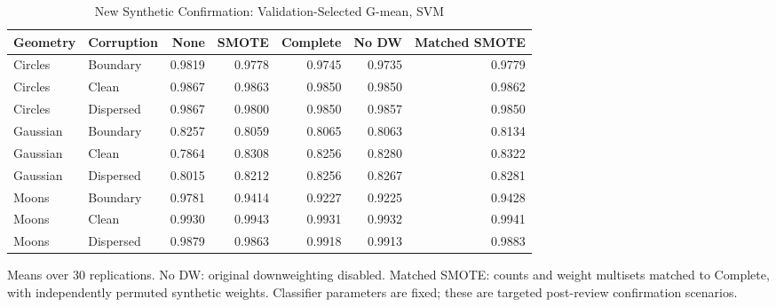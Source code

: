\begin{table}[t]
\caption{New Synthetic Confirmation: Validation-Selected G-mean, SVM}
\centering\small
\begin{tabular}{llrrrrr}
\hline
Geometry & Corruption & None & SMOTE & Complete & No DW & Matched SMOTE\\
\hline
Circles & Boundary & 0.9819 & 0.9778 & 0.9745 & 0.9735 & 0.9779 \\
Circles & Clean & 0.9867 & 0.9863 & 0.9850 & 0.9850 & 0.9862 \\
Circles & Dispersed & 0.9867 & 0.9800 & 0.9850 & 0.9857 & 0.9850 \\
Gaussian & Boundary & 0.8257 & 0.8059 & 0.8065 & 0.8063 & 0.8134 \\
Gaussian & Clean & 0.7864 & 0.8308 & 0.8256 & 0.8280 & 0.8322 \\
Gaussian & Dispersed & 0.8015 & 0.8212 & 0.8256 & 0.8267 & 0.8281 \\
Moons & Boundary & 0.9781 & 0.9414 & 0.9227 & 0.9225 & 0.9428 \\
Moons & Clean & 0.9930 & 0.9943 & 0.9931 & 0.9932 & 0.9941 \\
Moons & Dispersed & 0.9879 & 0.9863 & 0.9918 & 0.9913 & 0.9883 \\
\hline
\end{tabular}
\par\smallskip\footnotesize Means over 30 replications. No DW: original downweighting disabled. Matched SMOTE: counts and weight multisets matched to Complete, with independently permuted synthetic weights. Classifier parameters are fixed; these are targeted post-review confirmation scenarios.
\end{table}
